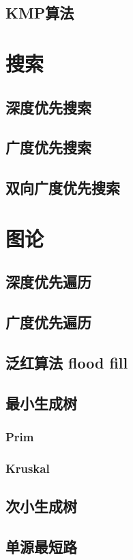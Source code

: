 \documentclass[12pt,twiside,a4paper]{ctexbook}
\numberwithin{chapter}{part}
\begin{document}
\section{KMP算法}

\chapter{搜索}
\section{深度优先搜索}
\section{广度优先搜索}
\section{双向广度优先搜索}

\chapter{图论}
\section{深度优先遍历}
\section{广度优先遍历}
\section{泛红算法 flood fill}
\section{最小生成树}
\subsection{Prim}
\subsection{Kruskal}
\section{次小生成树}
\section{单源最短路}
\end{document}
